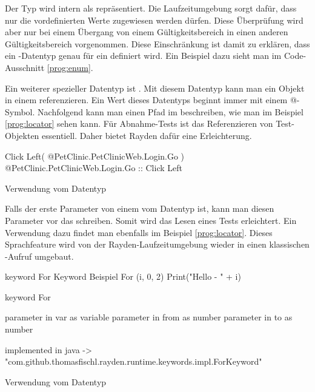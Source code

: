 \SuperPar
Der Typ  wird intern als  repräsentiert. Die Laufzeitumgebung sorgt dafür, dass nur die vordefinierten Werte zugewiesen werden dürfen. Diese Überprüfung wird aber nur bei einem Übergang von einem Gültigkeitsbereich in einen anderen Gültigkeitsbereich vorgenommen. Diese Einschränkung ist damit zu erklären, dass ein -Datentyp genau für ein  definiert wird. Ein Beispiel dazu sieht man im Code-Ausschnitt \ref{prog:enum}.  

\SuperPar
Ein weiterer spezieller Datentyp ist . Mit diesem Datentyp kann man ein Objekt in einem  referenzieren. Ein Wert dieses Datentyps beginnt immer mit einem @-Symbol. Nachfolgend kann man einen Pfad im  beschreiben, wie man im Beispiel \ref{prog:locator} sehen kann. Für Abnahme-Tests ist das Referenzieren von Test-Objekten essentiell. Daher bietet Rayden dafür eine Erleichterung. 

\begin{program}
\begin{JavaCode}
Click Left( @PetClinic.PetClinicWeb.Login.Go )
@PetClinic.PetClinicWeb.Login.Go :: Click Left
\end{JavaCode}
\caption{Verwendung vom Datentyp }
\label{prog:locator}
\end{program}

\SuperPar
Falls der erste Parameter von einem  vom Datentyp  ist, kann man diesen Parameter vor das  schreiben. Somit wird das Lesen eines Tests erleichtert. Ein Verwendung dazu findet man ebenfalls im Beispiel \ref{prog:locator}. Dieses Sprachfeature wird von der Rayden-Laufzeitumgebung wieder in einen klassischen -Aufruf umgebaut.

\begin{program}
\begin{JavaCode}
keyword For Keyword Beispiel {
	For (i, 0, 2) {
		Print("Hello - " + i)
	}
}

keyword For { 
	parameter in var as variable
	parameter in from as number
	parameter in to as number

	implemented in java -> "com.github.thomasfischl.rayden.runtime.keywords.impl.ForKeyword"
}
\end{JavaCode}
\caption{Verwendung vom Datentyp }
\label{prog:variable}
\end{program}

